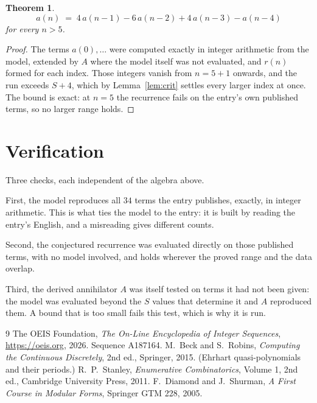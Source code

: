 \documentclass[11pt,a4paper]{article}
\theoremstyle{plain}
\newtheorem{theorem}{Theorem}
\theoremstyle{definition}
\begin{document}
\begin{theorem}
\[
a(n)\;=\;4\,a(n-1) - 6\,a(n-2) + 4\,a(n-3) - a(n-4)
\]
for every $n>5$.
\end{theorem}

\begin{proof}
The terms $a(0),\dots$ were computed exactly in integer arithmetic from the model, extended by
$A$ where the model itself was not evaluated, and $r(n)$ formed for each index. Those integers
vanish from $n=5+1$ onwards, and the run exceeds $S+4$, which by
Lemma~\ref{lem:crit} settles every larger index at once. The bound is exact: at $n=5$ the recurrence fails on the entry's own published terms, so no larger range holds.
\end{proof}

\section{Verification}

Three checks, each independent of the algebra above.

First, the model reproduces all $34$ terms the entry publishes, exactly, in integer
arithmetic. This is what ties the model to the entry: it is built by reading the entry's
English, and a misreading gives different counts.

Second, the conjectured recurrence was evaluated directly on those published terms, with no
model involved, and holds wherever the proved range and the data overlap.

Third, the derived annihilator $A$ was itself tested on terms it had not been given: the model
was evaluated beyond the $S$ values that determine it and $A$ reproduced them. A bound that is
too small fails this test, which is why it is run.

\begin{thebibliography}{9}
 The OEIS Foundation, \emph{The On-Line Encyclopedia of Integer
Sequences}, \url{https://oeis.org}, 2026. Sequence A187164.
 M.~Beck and S.~Robins, \emph{Computing the Continuous Discretely},
2nd ed., Springer, 2015. (Ehrhart quasi-polynomials and their periods.)
 R.~P.~Stanley, \emph{Enumerative Combinatorics}, Volume 1, 2nd ed.,
Cambridge University Press, 2011.
 F.~Diamond and J.~Shurman, \emph{A First Course in Modular Forms},
Springer GTM 228, 2005.
\end{thebibliography}
\end{document}
